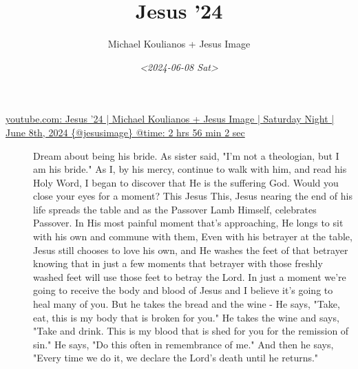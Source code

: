 \documentclass[11pt]{article}
\author{Michael Koulianos + Jesus Image}
\date{\textit{<2024-06-08 Sat>}}
\title{Jesus '24}
\begin{document}
\maketitle
\begin{description}
\item[{\href{https://youtube.com/watch?v=mLSCu4pKmu4\&t=10562}{youtube.com: Jesus '24 | Michael Koulianos + Jesus Image | Saturday Night | June 8th, 2024 \{@jesusimage\} @time: 2 hrs 56 min 2 sec}}] Dream about being his
bride. As sister said, "I'm not a
theologian, but I am his bride." As I,
by his mercy, continue to walk with
him, and read his Holy
Word, I began to
discover that He is the suffering
God. Would you close your eyes for a
moment? This Jesus
This, Jesus nearing the end of his
life spreads the
table and as the Passover Lamb
Himself, celebrates Passover.
In His most painful moment that's
approaching, He longs to
sit with his own and commune with
them, Even with his betrayer at the
table, Jesus still
chooses to love his
own, and He washes the feet of that
betrayer knowing that in just a few
moments that betrayer with those freshly
washed feet will use those
feet to betray the
Lord. In just a moment we're going to
receive the body and blood of Jesus and
I believe it's going to heal many of you.
But he takes the bread and the wine - He
says, "Take, eat, this is my
body that is broken for you." He takes the
wine and says, "Take and drink. This is my
blood that is shed for you for the
remission of
sin." He says, "Do this
often in remembrance of me."
And then he says, "Every time we do
it, we declare the Lord's
death until he returns."


\end{description}
\end{document}

